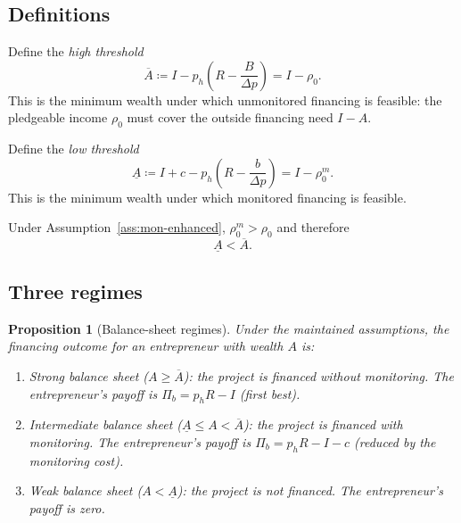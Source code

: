 \documentclass[11pt,a4paper,oneside]{book}
\def\leq{\leqslant}
\def\geq{\geqslant}
\theoremstyle{plain}
\newtheorem{proposition}[theorem]{Proposition}
\theoremstyle{definition}
\theoremstyle{remark}
\numberwithin{equation}{chapter}
\begin{document}
\subsection{Definitions}

Define the \emph{high threshold}
\begin{equation}\label{eq:mon-Aupper}
  \overline{A} \coloneqq I - p_h\left( R - \frac{B}{\Delta p} \right) = I - \rho_0.
\end{equation}
This is the minimum wealth under which unmonitored financing is feasible: the pledgeable income $\rho_0$ must cover the outside financing need $I - A$.

Define the \emph{low threshold}
\begin{equation}\label{eq:mon-Alower}
  \underline{A} \coloneqq I + c - p_h\left( R - \frac{b}{\Delta p} \right) = I - \rho_0^m.
\end{equation}
This is the minimum wealth under which monitored financing is feasible.

Under Assumption~\ref{ass:mon-enhanced}, $\rho_0^m > \rho_0$ and therefore
\begin{equation*}
  \underline{A} < \overline{A}.
\end{equation*}

\subsection{Three regimes}

\begin{proposition}[Balance-sheet regimes]\label{prop:mon-regimes}
Under the maintained assumptions, the financing outcome for an entrepreneur with wealth $A$ is:
\begin{enumerate}
  \item[\textup{(i)}] \emph{Strong balance sheet} ($A \geq \overline{A}$): the project is financed without monitoring.
  The entrepreneur's payoff is $\Pi_b = p_h R - I$ (first best).
  \item[\textup{(ii)}] \emph{Intermediate balance sheet} ($\underline{A} \leq A < \overline{A}$): the project is financed with monitoring.
  The entrepreneur's payoff is $\Pi_b = p_h R - I - c$ (reduced by the monitoring cost).
  \item[\textup{(iii)}] \emph{Weak balance sheet} ($A < \underline{A}$): the project is not financed.
  The entrepreneur's payoff is zero.
\end{enumerate}
\end{proposition}
\end{document}
